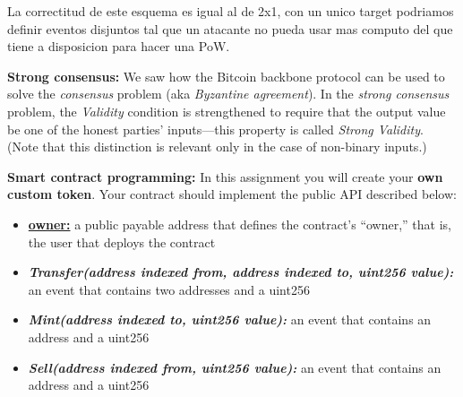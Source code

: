 \documentclass[12pt,addpoints,answers]{exam}
\begin{document}
\begin{questions}
\begin{parts}
\begin{solution}
        La correctitud de este esquema es igual al de 2x1, con un unico target podriamos definir eventos disjuntos tal que 
        un atacante no pueda usar mas computo del que tiene a disposicion para hacer una PoW.

    \end{solution}
    
    \end{parts}
    
\newpage

\question \textbf{Strong consensus:} We saw how the Bitcoin backbone protocol can be used to solve the {\em consensus} problem (aka {\em Byzantine agreement}). In the {\em strong consensus} problem, the {\em Validity} condition is strengthened to require that the output value be one of the honest parties' inputs---this property is called {\em Strong Validity}. (Note that this distinction is relevant only in the case of non-binary inputs.)


\newpage

\question \textbf{Smart contract programming:}  In this assignment you will create your {\bf own custom token}. Your contract should implement the public API described below:

\begin{itemize}
\item \underline{\textbf{owner:}} a public payable address that defines the contract’s ``owner,'' that is, the user that deploys the contract
\item \textbf{\textit{Transfer(address indexed from, address indexed to, uint256 value):}} an event that contains two addresses and a uint256
\item \textbf{\textit{Mint(address indexed to, uint256 value):}} an event that contains an address and a uint256
\item \textbf{\textit{Sell(address indexed from, uint256 value):}} an event that contains an address and a uint256


\end{itemize}
\end{questions}
\end{document}
